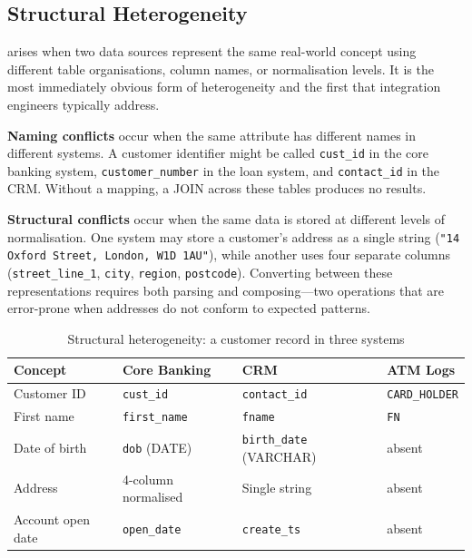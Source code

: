 \subsection{Structural Heterogeneity}
\label{subsec:structural-hetero}

 arises when two data sources represent
the same real-world concept using different table organisations, column
names, or normalisation levels. It is the most immediately obvious form
of heterogeneity and the first that integration engineers typically
address.

\textbf{Naming conflicts} occur when the same attribute has different
names in different systems. A customer identifier might be called
\texttt{cust\_id} in the core banking system, \texttt{customer\_number}
in the loan system, and \texttt{contact\_id} in the CRM. Without a
mapping, a JOIN across these tables produces no results.

\textbf{Structural conflicts} occur when the same data is stored at
different levels of normalisation. One system may store a customer's
address as a single string (\texttt{"14 Oxford Street, London, W1D 1AU"}),
while another uses four separate columns (\texttt{street\_line\_1},
\texttt{city}, \texttt{region}, \texttt{postcode}). Converting between
these representations requires both parsing and composing---two
operations that are error-prone when addresses do not conform to
expected patterns.

\begin{table}[h!t]
\centering
\caption{Structural heterogeneity: a customer record in three systems}
\label{tab:structural-hetero}
\renewcommand{\arraystretch}{1.3}
\begin{tabular}{L{3.0cm} L{2.8cm} L{2.6cm} L{2.4cm}}
\toprule
\textbf{Concept} & \textbf{Core Banking} & \textbf{CRM} & \textbf{ATM Logs} \\
\midrule
Customer ID      & \texttt{cust\_id}        & \texttt{contact\_id}  & \texttt{CARD\_HOLDER} \\
First name       & \texttt{first\_name}     & \texttt{fname}        & \texttt{FN} \\
Date of birth    & \texttt{dob} (DATE)      & \texttt{birth\_date} (VARCHAR) & absent \\
Address          & 4-column normalised      & Single string         & absent \\
Account open date & \texttt{open\_date}    & \texttt{create\_ts}   & absent \\
\bottomrule
\end{tabular}
\end{table}


